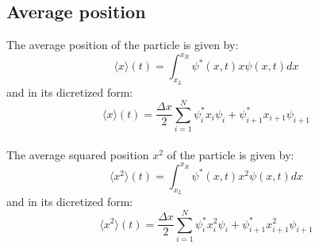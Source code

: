 \documentclass[a4paper,12pt,twoside]{article}
\begin{document}
  \subsection{Average position}
  The average position of the particle is given by:
  \begin{equation*}
   \langle x \rangle(t) = \int_{x_L}^{x_R}\psi^*(x,t)x\psi(x,t)dx
  \end{equation*}
  and in its dicretized form:
  \begin{equation*}
   \langle x \rangle(t) = \frac{\Delta x}{2} \sum_{i=1}^{N} \psi_i^*x_i\psi_i + \psi_{i+1}^*x_{i+1}\psi_{i+1}
  \end{equation*}\\
  The average squared position $x^2$ of the particle is given by:
  \begin{equation*}
   \langle x^2 \rangle(t) = \int_{x_L}^{x_R}\psi^*(x,t)x^2\psi(x,t)dx
  \end{equation*}
  and in its dicretized form:
  \begin{equation*}
   \langle x^2 \rangle(t) = \frac{\Delta x}{2} \sum_{i=1}^{N} \psi_i^*x_i^2\psi_i + \psi_{i+1}^*x_{i+1}^2\psi_{i+1}
  \end{equation*}
\end{document}
